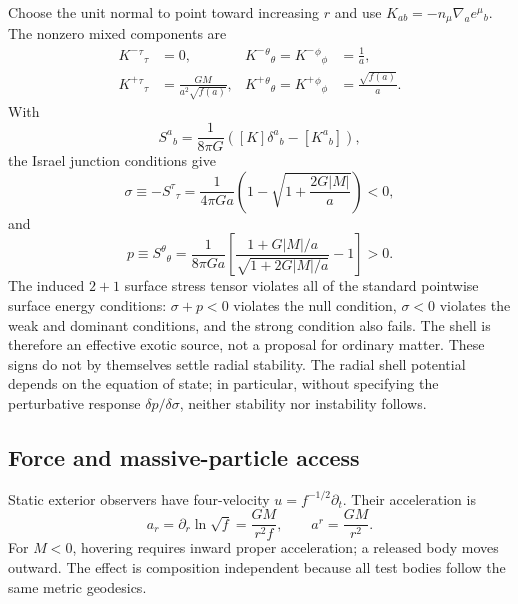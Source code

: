 \documentclass[aps,prd,twocolumn,amsmath,amssymb,nofootinbib]{revtex4-2}
\begin{document}
Choose the unit normal to point toward increasing $r$ and use
$K_{ab}=-n_{\mu}\nabla_a e^{\mu}{}_b$.  The nonzero mixed components are
\begin{align}
 K^-{}^{\tau}{}_{\tau}&=0,
 &K^-{}^{\theta}{}_{\theta}=K^-{}^{\phi}{}_{\phi}&=\frac{1}{a},
 \label{eq:Kminus}\\
 K^+{}^{\tau}{}_{\tau}&=\frac{GM}{a^2\sqrt{f(a)}},
 &K^+{}^{\theta}{}_{\theta}=K^+{}^{\phi}{}_{\phi}
 &=\frac{\sqrt{f(a)}}{a}.
 \label{eq:Kplus}
\end{align}
With
\begin{equation}
 S^a{}_b=\frac{1}{8\pi G}
 \left([K]\delta^a{}_b-[K^a{}_b]\right),
 \label{eq:israel}
\end{equation}
the Israel junction conditions \cite{israel-1966,poisson-2004} give
\begin{equation}
 \sigma\equiv-S^{\tau}{}_{\tau}
 =\frac{1}{4\pi Ga}
 \left(1-\sqrt{1+\frac{2G|M|}{a}}\right)<0,
 \label{eq:sigma}
\end{equation}
and
\begin{equation}
 p\equiv S^{\theta}{}_{\theta}
 =\frac{1}{8\pi Ga}
 \left[
 \frac{1+G|M|/a}{\sqrt{1+2G|M|/a}}-1
 \right]>0.
 \label{eq:pressure}
\end{equation}
The induced $2+1$ surface stress tensor violates all of the standard
pointwise surface energy conditions: $\sigma+p<0$ violates the null condition,
$\sigma<0$ violates the weak and dominant conditions, and the strong condition
also fails.  The shell is therefore an effective exotic source, not a proposal
for ordinary matter.  These signs do not by themselves settle radial
stability.  The radial shell potential depends on the equation of state; in
particular, without specifying the perturbative response
$\delta p/\delta\sigma$, neither stability nor instability follows.

\subsection{Force and massive-particle access}

Static exterior observers have four-velocity $u=f^{-1/2}\partial_t$.  Their
acceleration is
\begin{equation}
 a_r=\partial_r\ln\sqrt f=\frac{GM}{r^2f},
 \qquad
 a^r=\frac{GM}{r^2}.
 \label{eq:staticacc}
\end{equation}
For $M<0$, hovering requires inward proper acceleration; a released body moves
outward.  The effect is composition independent because all test bodies follow
the same metric geodesics.
\end{document}
